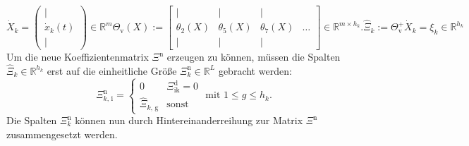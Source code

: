 \begin{subequations}
\begin{equation}
\dot{X}_k = 	\left(\begin{array}{c} 
      					 \mid \\
      					 \dot{x}_k(t)\\ 
      					 \mid 
    				\end{array}\right) \in \mathbb{R}^{m}
\end{equation}
\begin{equation}
\Theta_\text{v}(X) := \begin{bmatrix}
		\mid & \mid &  \mid &\\
		\theta_2(X) & \theta_5(X) & \theta_7(X) &\dots\\
		\mid & \mid &  \mid &
	\end{bmatrix}\in\mathbb{R}^{m\times h_k}.
\end{equation}
\begin{equation}
\hat{\Xi}_k := \Theta_\text{v}^+\dot{X}_k = \xi_k  \in\mathbb{R}^{h_k} \label{eq:xi_select}
\end{equation}
\end{subequations}
Um die neue Koeffizientenmatrix $\Xi^\text{n}$ erzeugen zu können, müssen die Spalten $\hat{\Xi}_k\in\mathbb{R}^{h_k}$ erst auf die einheitliche Größe $\Xi^\text{n}_k\in\mathbb{R}^{L}$ gebracht werden:
\begin{equation}
\Xi^\text{n}_\text{$k$, i} = \begin{cases}
						0 & \Xi^\text{d}_\text{ik}=0\\
						\hat{\Xi}_\text{$k$, g}  & \text{sonst}

\end{cases}\text{ mit }1\leq g \leq h_k. \label{eq:reshape} 
\end{equation}
Die Spalten $\Xi^\text{n}_k$ können nun durch Hintereinanderreihung zur Matrix $\Xi^\text{n}$ zusammengesetzt werden. 


